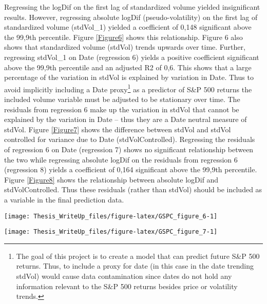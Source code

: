 \documentclass[11pt,preprint, authoryear]{elsarticle}
\let\origfigure\figure
\let\endorigfigure\endfigure
\renewenvironment{figure}[1][2] {
    \expandafter\origfigure\expandafter[H]
} {
    \endorigfigure
}
\numberwithin{equation}{section}
\numberwithin{figure}{section}
\numberwithin{table}{section}
\let\rmarkdownfootnote\footnote%
\def\footnote{\protect\rmarkdownfootnote}
\begin{document}
Regressing the logDif on the first lag of standardized volume yielded
insignificant results. However, regressing absolute logDif
(pseudo-volatility) on the first lag of standardized volume (stdVol\_1)
yielded a coefficient of 0,148 significant above the 99,9th percentile.
Figure \ref{Figure6} shows this relationship. Figure 6 also shows that
standardized volume (stdVol) trends upwards over time. Further,
regressing stdVol\_1 on Date (regression 6) yields a positive
coefficient significant above the 99,9th percentile and an adjusted R2
of 0,6. This shows that a large percentage of the variation in stdVol is
explained by variation in Date. Thus to avoid implicitly including a
Date proxy\footnote{The goal of this project is to create a model that
  can predict future S\&P 500 returns. Thus, to include a proxy for date
  (in this case in the date trending stdVol) would cause data
  contamination since dates do not hold any information relevant to the
  S\&P 500 returns besides price or volatility trends.} as a predictor
of S\&P 500 returns the included volume variable must be adjusted to be
stationary over time. The residuals from regression 6 make up the
variation in stdVol that cannot be explained by the variation in Date --
thus they are a Date neutral measure of stdVol. Figure \ref{Figure7}
shows the difference between stdVol and stdVol controlled for variance
due to Date (stdVolControlled). Regressing the residuals of regression 6
on Date (regression 7) shows no significant relationship between the two
while regressing absolute logDif on the residuals from regression 6
(regression 8) yields a coefficient of 0,164 significant above the
99,9th percentile. Figure \ref{Figure8} shows the relationship between
absolute logDif and stdVolControlled. Thus these residuals (rather than
stdVol) should be included as a variable in the final prediction data.

\begin{figure}[H]

{\centering \texttt{[image: Thesis\_WriteUp\_files/figure-latex/GSPC\_figure\_6-1]} 

}

\caption{Absolute logDiff and stdVol \label{Figure6}}\label{fig:GSPC_figure_6}
\end{figure}

\begin{figure}[H]

{\centering \texttt{[image: Thesis\_WriteUp\_files/figure-latex/GSPC\_figure\_7-1]} 

}

\caption{DateResid of StdVol (Red) and stdVol (Green) \label{Figure7}}\label{fig:GSPC_figure_7}
\end{figure}
\end{document}
